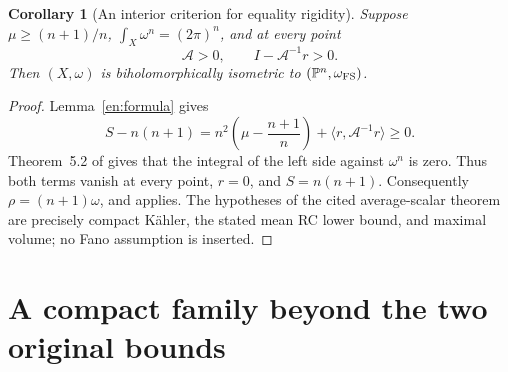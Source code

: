 \documentclass[12pt]{amsart}
\newtheorem{cor}[thm]{Corollary}
\theoremstyle{definition}
\theoremstyle{remark}
\numberwithin{equation}{section}
\theoremstyle{plain}
\theoremstyle{remark}
\theoremstyle{definition}
\begin{document}
\begin{cor}[An interior criterion for equality rigidity]\label{en:interior}
Suppose $\mu\geq(n+1)/n$, $\int_X\omega^n=(2\pi)^n$, and at every point
\[
 \mathcal A>0,\qquad I-\mathcal A^{-1}r>0.
\]
Then $(X,\omega)$ is biholomorphically isometric to
$(\mathbb P^n,\omega_{\rm FS})$.
\end{cor}

\begin{proof}
Lemma~\ref{en:formula} gives
\[
 S-n(n+1)=n^2\left(\mu-\frac{n+1}{n}\right)
          +\langle r,\mathcal A^{-1}r\rangle\geq0.
\]
Theorem~5.2 of \cite{en:DS} gives that the integral of the left side
against $\omega^n$ is zero. Thus both terms vanish at every point,
$r=0$, and $S=n(n+1)$. Consequently $\rho=(n+1)\omega$, and
\cite[Corollary 5.3(2)]{en:DS} applies. The hypotheses of the cited
average-scalar theorem are precisely compact K\"ahler, the stated mean RC
lower bound, and maximal volume; no Fano assumption is inserted.
\end{proof}

\section{A compact family beyond the two original bounds}\label{en:examples}
\end{document}
